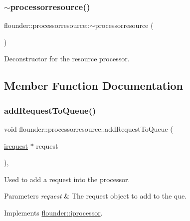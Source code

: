 \subsubsection{\texorpdfstring{$\sim$processorresource()}{~processorresource()}}
{\footnotesize\ttfamily flounder\+::processorresource\+::$\sim$processorresource (\begin{DoxyParamCaption}{ }\end{DoxyParamCaption})}



Deconstructor for the resource processor. 



\subsection{Member Function Documentation}
\mbox{\label{classflounder_1_1processorresource_a4ae0dda615f98e93faadda22e74d61e2}} 
\subsubsection{\texorpdfstring{add\+Request\+To\+Queue()}{addRequestToQueue()}}
{\footnotesize\ttfamily void flounder\+::processorresource\+::add\+Request\+To\+Queue (\begin{DoxyParamCaption}\item[{\hyperlink{classflounder_1_1irequest}{irequest} $\ast$}]{request }\end{DoxyParamCaption})\hspace{0.3cm}{\ttfamily [override]}, {\ttfamily [virtual]}}



Used to add a request into the processor. 


\begin{DoxyParams}{Parameters}
{\em request} & The request object to add to the que. \\
\hline
\end{DoxyParams}


Implements \hyperlink{classflounder_1_1iprocessor_ad721814a6a2c69f526527c7b2f57a11b}{flounder\+::iprocessor}.

\mbox{\label{classflounder_1_1processorresource_afde339d8e44544307abd585e8294fa85}} 
